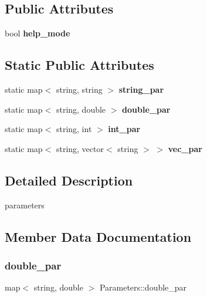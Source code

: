 \subsection*{Public Attributes}
\begin{DoxyCompactItemize}
\item 
\mbox{\label{classParameters_a30603ec32ff15d1480d90c81d15f3537}} 
bool {\bfseries help\+\_\+mode}
\end{DoxyCompactItemize}
\subsection*{Static Public Attributes}
\begin{DoxyCompactItemize}
\item 
static map$<$ string, string $>$ {\bfseries string\+\_\+par}
\item 
static map$<$ string, double $>$ {\bfseries double\+\_\+par}
\item 
static map$<$ string, int $>$ {\bfseries int\+\_\+par}
\item 
static map$<$ string, vector$<$ string $>$ $>$ {\bfseries vec\+\_\+par}
\end{DoxyCompactItemize}


\subsection{Detailed Description}
parameters 

\subsection{Member Data Documentation}
\mbox{\label{classParameters_a9ea8ecd148f69f272827ade1dd5a032d}} 
\subsubsection{\texorpdfstring{double\+\_\+par}{double\_par}}
{\footnotesize\ttfamily map$<$ string, double $>$ Parameters\+::double\+\_\+par\hspace{0.3cm}{\ttfamily [static]}}

